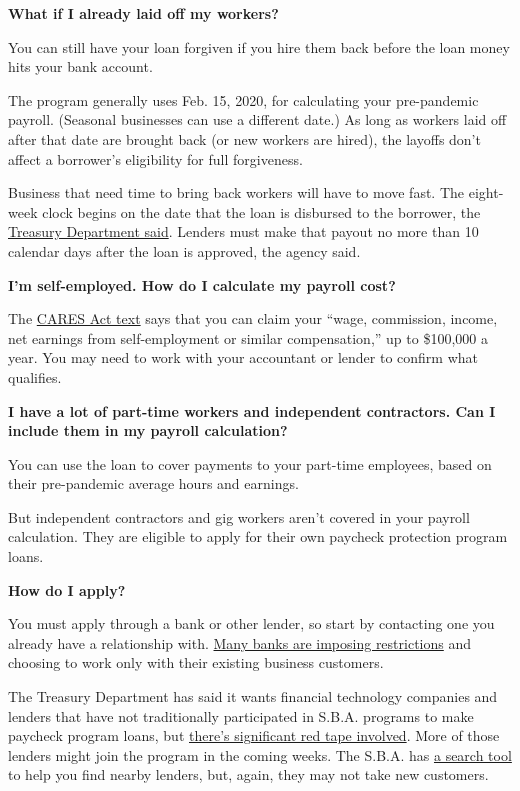 \textbf{What if I already laid off my workers?}

You can still have your loan forgiven if you hire them back before the
loan money hits your bank account.

The program generally uses Feb. 15, 2020, for calculating your
pre-pandemic payroll. (Seasonal businesses can use a different date.) As
long as workers laid off after that date are brought back (or new
workers are hired), the layoffs don't affect a borrower's eligibility
for full forgiveness.

Business that need time to bring back workers will have to move fast.
The eight-week clock begins on the date that the loan is disbursed to
the borrower, the
\href{https://home.treasury.gov/system/files/136/Paycheck-Protection-Program-Frequenty-Asked-Questions.pdf}{Treasury
Department said}. Lenders must make that payout no more than 10 calendar
days after the loan is approved, the agency said.

\textbf{I'm self-employed. How do I calculate my payroll cost?}

The
\href{https://www.congress.gov/bill/116th-congress/house-bill/748/text}{CARES
Act text} says that you can claim your ``wage, commission, income, net
earnings from self-employment or similar compensation,'' up to \$100,000
a year. You may need to work with your accountant or lender to confirm
what qualifies.

\textbf{I have a lot of part-time workers and independent contractors.
Can I include them in my payroll calculation?}

You can use the loan to cover payments to your part-time employees,
based on their pre-pandemic average hours and earnings.

But independent contractors and gig workers aren't covered in your
payroll calculation. They are eligible to apply for their own paycheck
protection program loans.

\textbf{How do I apply?}

You must apply through a bank or other lender, so start by contacting
one you already have a relationship with.
\href{https://www.nytimes3xbfgragh.onion/2020/04/03/business/sba-loans-coronavirus.html}{Many
banks are imposing restrictions} and choosing to work only with their
existing business customers.

The Treasury Department has said it wants financial technology companies
and lenders that have not traditionally participated in S.B.A. programs
to make paycheck program loans, but
\href{https://www.nytimes3xbfgragh.onion/2020/04/09/technology/online-lenders-stimulus-virus.html}{there's
significant red tape involved}. More of those lenders might join the
program in the coming weeks. The S.B.A. has
\href{https://www.sba.gov/paycheckprotection/find}{a search tool} to
help you find nearby lenders, but, again, they may not take new
customers.

